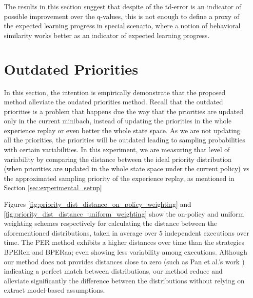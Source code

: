 The results in this section suggest that despite of the td-error is an indicator of possible improvement over the q-values, this is not enough to define a proxy of the expected learning progress in special scenario, where a notion of behavioral similarity works better as an indicator of expected learning progress.

\section{Outdated Priorities}

In this section, the intention is empirically demonstrate that the proposed method alleviate the oudated priorities method. Recall that the outdated priorities is a problem that happens due the way that the priorities are updated only in the current minibach, instead of updating the priorities in the whole experience replay or even better the whole state space. As we are not updating all the priorities, the priorities will be outdated leading to sampling probabilities with certain variabilities. In this experiment, we are measuring that level of variability by comparing the distance between the ideal priority distribution (when priorities are updated in the whole state space under the current policy) vs the approximated sampling priority of the experience replay, as mentioned in Section \ref{sec:experimental_setup}

Figures \ref{fig:priority_dist_distance_on_policy_weighting} and \ref{fig:priority_dist_distance_uniform_weighting} show the on-policy and uniform weighting schemes respectively for calculating the distance between the aforementioned distributions, taken in average over 5 independent executions over time. The PER method exhibits a higher distances over time than the strategies BPERcn and BPERaa; even showing less variability among executions. Although our method does not provides distances close to zero (such as Pan et al.'s work \cite{pan2022understanding}) indicating a perfect match between distributions, our method reduce and alleviate significantly the difference between the distributions without relying on extract model-based assumptions. 

